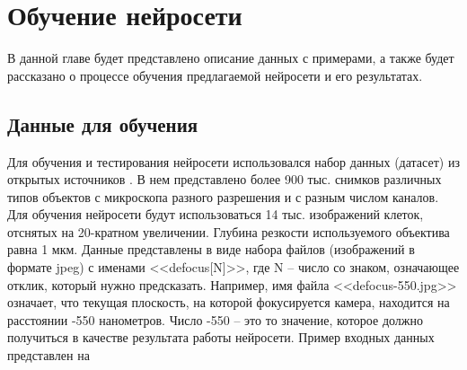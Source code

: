 
\chapter{Обучение нейросети} \label{ch3}


В данной главе будет представлено описание данных с примерами, а также будет рассказано о процессе обучения предлагаемой нейросети и его результатах.

\section{Данные для обучения} \label{ch3:sec1}
Для обучения и тестирования нейросети использовался набор данных (датасет) из открытых источников \cite{jiang2018transform}. В нем представлено более 900 тыс. снимков различных типов объектов с микроскопа разного разрешения и с разным числом каналов. Для обучения нейросети будут использоваться 14 тыс. изображений клеток, отснятых на 20-кратном увеличении. Глубина резкости используемого объектива равна 1 мкм. Данные представлены в виде набора файлов (изображений в формате jpeg) с именами <<defocus[N]>>, где N -- число со знаком, означающее отклик, который нужно предсказать. Например, имя файла <<defocus-550.jpg>> означает, что текущая плоскость, на которой фокусируется камера, находится на расстоянии -550 нанометров. Число -550 -- это то значение, которое должно получиться в качестве результата работы нейросети. Пример входных данных представлен на 

